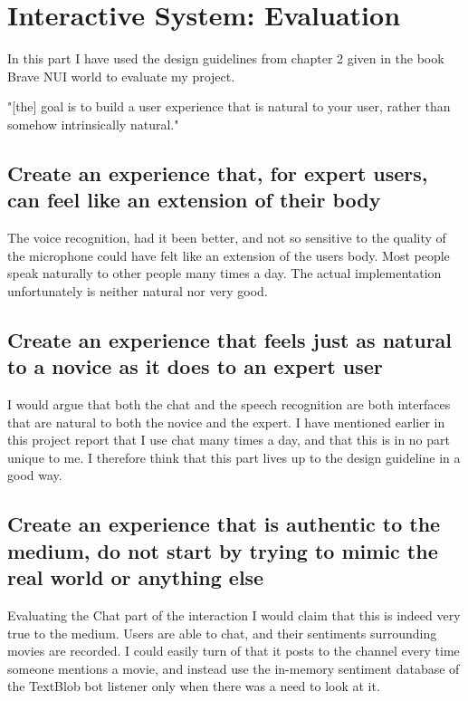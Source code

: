 \documentclass[11pt,fleqn]{book} %
\begin{document}

\chapter{Interactive System: Evaluation}
In this part I have used the design guidelines from chapter 2 given in the book Brave NUI\cite{Wigdor2010BraveWorld} world to evaluate my project.

"[the] goal is to build a user experience
that is natural to your user, rather than somehow intrinsically natural\cite{Wigdor2010BraveWorld}."

\section{Create an experience that, for expert users, can feel like an extension of their
body}
The voice recognition, had it been better, and not so sensitive to the quality of the microphone could have felt like an extension of the users body. Most people speak naturally to other people many times a day. The actual implementation unfortunately is neither natural nor very good.

\section{Create an experience that feels just as natural to a novice as it does to an
expert user}
I would argue that both the chat and the speech recognition are both interfaces that are natural to both the novice and the expert. I have mentioned earlier in this project report that I use chat many times a day, and that this is in no part unique to me. I therefore think that this part lives up to the design guideline in a good way.

\section{Create an experience that is authentic to the medium, do not start by trying to
mimic the real world or anything else}
Evaluating the Chat part of the interaction I would claim that this is indeed very true to the medium. Users are able to chat, and their sentiments surrounding movies are recorded. I could easily turn of that it posts to the channel every time someone mentions a movie, and instead use the in-memory sentiment database of the TextBlob bot listener only when there was a need to look at it.
\end{document}
